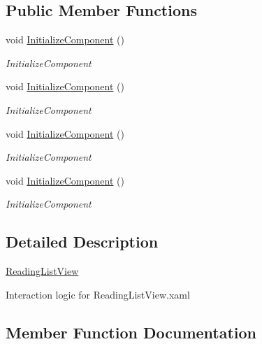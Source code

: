 \subsection*{Public Member Functions}
\begin{DoxyCompactItemize}
\item 
void \hyperlink{class_presentation_1_1_view_1_1_list_1_1_reading_list_view_ac889482272d93e01a46d543e008f0e05}{Initialize\+Component} ()
\begin{DoxyCompactList}\small\item\em Initialize\+Component \end{DoxyCompactList}\item 
void \hyperlink{class_presentation_1_1_view_1_1_list_1_1_reading_list_view_ac889482272d93e01a46d543e008f0e05}{Initialize\+Component} ()
\begin{DoxyCompactList}\small\item\em Initialize\+Component \end{DoxyCompactList}\item 
void \hyperlink{class_presentation_1_1_view_1_1_list_1_1_reading_list_view_ac889482272d93e01a46d543e008f0e05}{Initialize\+Component} ()
\begin{DoxyCompactList}\small\item\em Initialize\+Component \end{DoxyCompactList}\item 
void \hyperlink{class_presentation_1_1_view_1_1_list_1_1_reading_list_view_ac889482272d93e01a46d543e008f0e05}{Initialize\+Component} ()
\begin{DoxyCompactList}\small\item\em Initialize\+Component \end{DoxyCompactList}\end{DoxyCompactItemize}


\subsection{Detailed Description}
\hyperlink{class_presentation_1_1_view_1_1_list_1_1_reading_list_view}{Reading\+List\+View} 

Interaction logic for Reading\+List\+View.\+xaml 

\subsection{Member Function Documentation}
\mbox{\label{class_presentation_1_1_view_1_1_list_1_1_reading_list_view_ac889482272d93e01a46d543e008f0e05}} 
